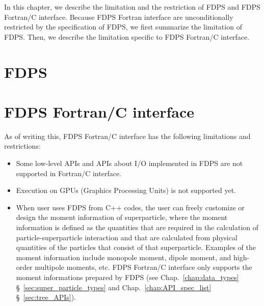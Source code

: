 In this chapter, we describe the limitation and the restriction of FDPS and FDPS Fortran/C interface. Because FDPS Fortran interface are unconditionally restricted by the specification of FDPS, we first summarize the limitation of FDPS. Then, we describe the limitation specific to FDPS Fortran/C interface.

\section{FDPS}
\label{sec:limitation:FDPS}



\section{FDPS Fortran/C interface}
\label{sec:limitation:FDPS_ftn_if}

As of writing this, FDPS Fortran/C interface has the following limitations and restrictions:
\begin{itemize}[leftmargin=*,itemsep=-1ex]
\item Some low-level APIs and APIs about I/O implemented in FDPS are not supported in Fortran/C interface.
\item Execution on GPUs (Graphics Processing Units) is not supported yet.
\item When user uses FDPS from C++ codes, the user can freely customize or design the moment information of superparticle, where the moment information is defined as the quantities that are required in the calculation of particle-superparticle interaction and that are calculated from physical quantities of the particles that consist of that superparticle. Examples of the moment information include monopole moment, dipole moment, and high-order multipole moments, etc. FDPS Fortran/C interface only supports the moment informations prepared by FDPS (see Chap.~\ref{chap:data_types} \S~\ref{sec:super_particle_types} and Chap.~\ref{chap:API_spec_list} \S~\ref{sec:tree_APIs}).
\end{itemize}